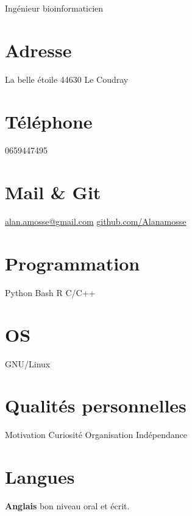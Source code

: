 \documentclass[]{friggeri-cv}
\begin{document}
      {Ingénieur bioinformaticien}
\begin{aside}
  \section{Adresse}
    La belle étoile
    44630 Le Coudray
    ~
  \section{Téléphone}
    0659447495
    ~
  \section{Mail \& Git}
    \href{mailto:alan.amosse@gmail.com}{alan.amosse@gmail.com}
    \href{https://github.com/Alanamosse}{github.com/Alanamosse}
    ~
  \section{Programmation}
    Python
    Bash
    R
    C/C++
    ~
  \section{OS}
    GNU/Linux
    ~
  \section{Qualités personnelles}
    Motivation
    Curiosité
    Organisation
    Indépendance
    ~
  \section{Langues}
    \textbf{Anglais} bon niveau oral et écrit.
\end{aside}
\end{document}
